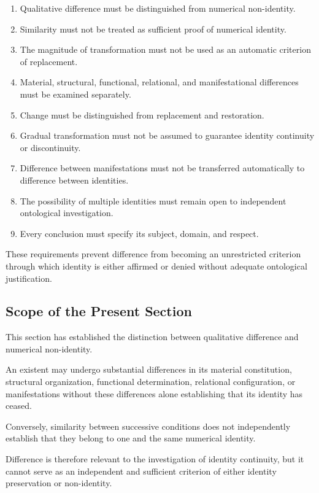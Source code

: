 \begin{enumerate}
    \item Qualitative difference must be distinguished
    from numerical non-identity.
    \item Similarity must not be treated as sufficient
    proof of numerical identity.
    \item The magnitude of transformation must not
    be used as an automatic criterion of replacement.
    \item Material, structural, functional, relational,
    and manifestational differences must be examined
    separately.
    \item Change must be distinguished from replacement
    and restoration.
    \item Gradual transformation must not be assumed
    to guarantee identity continuity or discontinuity.
    \item Difference between manifestations must not
    be transferred automatically to difference between
    identities.
    \item The possibility of multiple identities must
    remain open to independent ontological investigation.
    \item Every conclusion must specify its subject,
    domain, and respect.
\end{enumerate}

These requirements prevent difference from becoming
an unrestricted criterion through which identity
is either affirmed or denied without adequate
ontological justification.

\subsection{Scope of the Present Section}

This section has established the distinction between
qualitative difference and numerical non-identity.

An existent may undergo substantial differences
in its material constitution, structural organization,
functional determination, relational configuration,
or manifestations without these differences alone
establishing that its identity has ceased.

Conversely, similarity between successive conditions
does not independently establish that they belong
to one and the same numerical identity.

Difference is therefore relevant to the investigation
of identity continuity, but it cannot serve as
an independent and sufficient criterion of either
identity preservation or non-identity.


